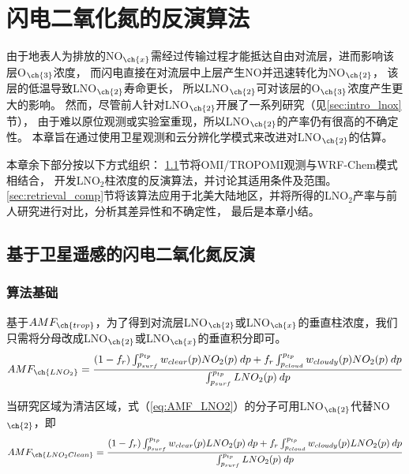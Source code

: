 
\chapter{闪电二氧化氮的反演算法} \label{sec:retrieval}

由于地表人为排放的NO$_{\ch{x}}$需经过传输过程才能抵达自由对流层，进而影响该层O$_{\ch{3}}$浓度，
而闪电直接在对流层中上层产生NO并迅速转化为NO$_{\ch{2}}$，
该层的低温导致LNO$_{\ch{2}}$寿命更长，
所以LNO$_{\ch{2}}$可对该层的O$_{\ch{3}}$浓度产生更大的影响。
然而，尽管前人针对LNO$_{\ch{2}}$开展了一系列研究（见\ref{sec:intro_lnox}节），
由于难以原位观测或实验室重现，所以LNO$_{\ch{2}}$的产率仍有很高的不确定性。
本章旨在通过使用卫星观测和云分辨化学模式来改进对LNO$_{\ch{2}}$的估算。

本章余下部分按以下方式组织：
\ref{sec:retrieval_method}节将OMI/TROPOMI观测与WRF-Chem模式相结合，
开发LNO$_2$柱浓度的反演算法，并讨论其适用条件及范围。
\ref{sec:retrieval_comp}节将该算法应用于北美大陆地区，并将所得的LNO$_2$产率与前人研究进行对比，分析其差异性和不确定性，
最后是本章小结。

\section{基于卫星遥感的闪电二氧化氮反演} \label{sec:retrieval_method}

\subsection{算法基础} \label{sec:amf_definition}

基于$AMF_{\ch{trop}}$，为了得到对流层LNO$_{\ch{2}}$或LNO$_{\ch{x}}$的垂直柱浓度，我们只需将分母改成LNO$_{\ch{2}}$或LNO$_{\ch{x}}$的垂直积分即可。
\begin{equation} \label{eq:AMF_LNO2}
AMF_{\ch{LNO_2}} = \frac{(1-f_r) \int_{p_{surf}}^{p_{tp}} w_{clear}(p) NO_2(p) \: dp + f_r \int_{p_{cloud}}^{p_{tp}} w_{cloudy}(p) NO_2(p) \: dp}{\int_{p_{surf}}^{p_{tp}} LNO_2(p) \: dp}
\end{equation}

当研究区域为清洁区域，式（\ref{eq:AMF_LNO2}）的分子可用LNO$_{\ch{2}}$代替NO$_{\ch{2}}$，即
\begin{equation} \label{eq:AMF_LNO2clean}
AMF_{\ch{LNO_2Clean}} = \frac{(1-f_r) \int_{p_{surf}}^{p_{tp}} w_{clear}(p) LNO_2(p) \: dp + f_r \int_{p_{cloud}}^{p_{tp}} w_{cloudy}(p) LNO_2(p) \: dp}{\int_{p_{surf}}^{p_{tp}} LNO_2(p) \: dp}
\end{equation}

